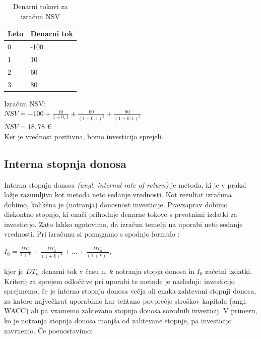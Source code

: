 \begin{table}[ht]
	\caption{Denarni tokovi za izračun NSV}
	\centering
	\begin{tabular}{|L|L|}
	\hline
	\textbf{Leto} & \textbf{Denarni tok} \\
	\hline
	&-100\\
	&10\\
	&60\\
	&80\\
	\hline
	\end{tabular}
\end{table}

Izračun NSV:\\
$NSV = -100 + \tfrac{10}{1+0,1} + \tfrac{60}{(1+0,1)^2} + \tfrac{80}{(1+0,1)^3}$ \\[0,5 cm]
$NSV = 18,78$ €  \\

Ker je vrednost pozitivna, bomo investicijo sprejeli.

\subsection{Interna stopnja donosa}
Interna stopnja donosa \textit{(angl. internal rate of return)} je metoda, ki je v praksi lažje razumljiva kot metoda neto sedanje vrednosti. Kot rezultat izračuna dobimo, kolikšna je (notranja) donosnost investicije. Pravzaprav dobimo diskontno stopnjo, ki enači prihodnje denarne tokove s prvotnimi izdatki za investicijo. Zato lahko ugotovimo, da izračun temelji na uporabi neto sedanje vrednosti. Pri izračunu si pomagamo s spodnjo formulo \cite[str. 156]{Mramor}:\\

\begin{center}
$I_0 = \tfrac{DT_1}{1+k} + \tfrac{DT_2}{(1+k)^2} + ... + \tfrac{DT_n}{(1+k)^n}$,\\
\end{center}

kjer je $DT_n$ denarni tok v času n, $k$ notranja stopja donosa in $I_0$ začetni izdatki. \\

Kriterij za sprejem odločitve pri uporabi te metode je naslednji: investicijo sprejmemo, če je interna stopnja donosa večja ali enaka zahtevani stopnji donosa, za katero največkrat uporabimo kar tehtano povprečje stroškov kapitala (angl. WACC) ali pa vzamemo zahtevano stopnjo donosa sorodnih investicij. V primeru, ko je notranja stopnja donosa manjša od zahtevane stopnje, pa investicijo zavrnemo. Če poenostavimo:


